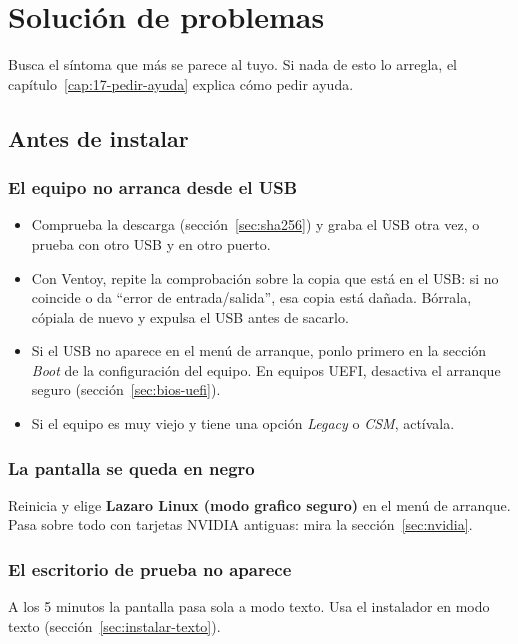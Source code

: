 \chapter{Solución de problemas}\label{cap:16-problemas}

Busca el síntoma que más se parece al tuyo. Si nada de esto lo arregla,
el capítulo~\ref{cap:17-pedir-ayuda} explica cómo pedir ayuda.

\section{Antes de instalar}

\subsection{El equipo no arranca desde el USB}\label{sec:prob-no-arranca}
\begin{itemize}
  \item Comprueba la descarga (sección~\ref{sec:sha256}) y graba el USB
        otra vez, o prueba con otro USB y en otro puerto.
  \item Con Ventoy, repite la comprobación sobre la copia que está en el
        USB: si no coincide o da \enquote{error de entrada/salida}, esa copia
        está dañada. Bórrala, cópiala de nuevo y expulsa el USB antes de
        sacarlo.
  \item Si el USB no aparece en el menú de arranque, ponlo primero en la
        sección \emph{Boot} de la configuración del equipo. En equipos UEFI,
        desactiva el arranque seguro (sección~\ref{sec:bios-uefi}).
  \item Si el equipo es muy viejo y tiene una opción \emph{Legacy} o
        \emph{CSM}, actívala.
\end{itemize}

\subsection{La pantalla se queda en negro}
Reinicia y elige \textbf{Lazaro Linux (modo grafico seguro)} en el menú de
arranque. Pasa sobre todo con tarjetas NVIDIA antiguas: mira
la sección~\ref{sec:nvidia}.

\subsection{El escritorio de prueba no aparece}
A los 5 minutos la pantalla pasa sola a modo texto. Usa el instalador en
modo texto (sección~\ref{sec:instalar-texto}).

